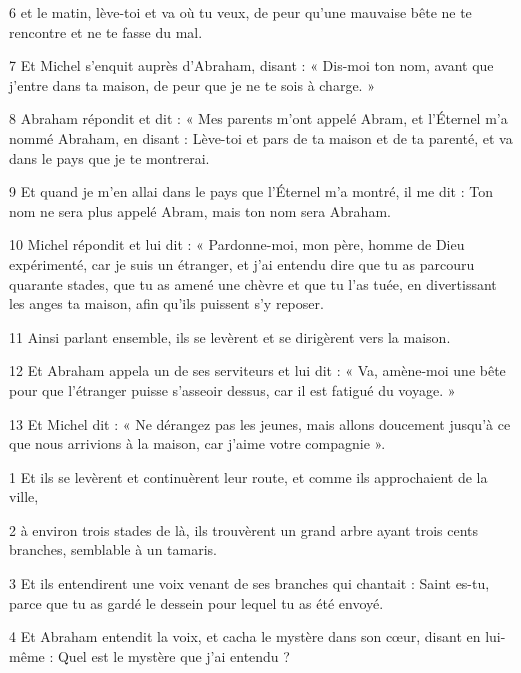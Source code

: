 \par 6 et le matin, lève-toi et va où tu veux, de peur qu'une mauvaise bête ne te rencontre et ne te fasse du mal.

\par 7 Et Michel s'enquit auprès d'Abraham, disant : « Dis-moi ton nom, avant que j'entre dans ta maison, de peur que je ne te sois à charge. »

\par 8 Abraham répondit et dit : « Mes parents m'ont appelé Abram, et l'Éternel m'a nommé Abraham, en disant : Lève-toi et pars de ta maison et de ta parenté, et va dans le pays que je te montrerai.

\par 9 Et quand je m'en allai dans le pays que l'Éternel m'a montré, il me dit : Ton nom ne sera plus appelé Abram, mais ton nom sera Abraham.

\par 10 Michel répondit et lui dit : « Pardonne-moi, mon père, homme de Dieu expérimenté, car je suis un étranger, et j'ai entendu dire que tu as parcouru quarante stades, que tu as amené une chèvre et que tu l'as tuée, en divertissant les anges ta maison, afin qu'ils puissent s'y reposer.

\par 11 Ainsi parlant ensemble, ils se levèrent et se dirigèrent vers la maison.

\par 12 Et Abraham appela un de ses serviteurs et lui dit : « Va, amène-moi une bête pour que l'étranger puisse s'asseoir dessus, car il est fatigué du voyage. »

\par 13 Et Michel dit : « Ne dérangez pas les jeunes, mais allons doucement jusqu'à ce que nous arrivions à la maison, car j'aime votre compagnie ».


\par 1 Et ils se levèrent et continuèrent leur route, et comme ils approchaient de la ville,

\par 2 à environ trois stades de là, ils trouvèrent un grand arbre ayant trois cents branches, semblable à un tamaris.

\par 3 Et ils entendirent une voix venant de ses branches qui chantait : Saint es-tu, parce que tu as gardé le dessein pour lequel tu as été envoyé.

\par 4 Et Abraham entendit la voix, et cacha le mystère dans son cœur, disant en lui-même : Quel est le mystère que j'ai entendu ?

